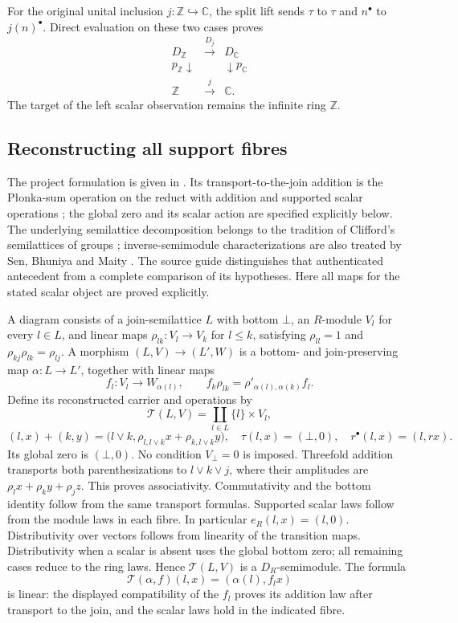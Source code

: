 For the original unital inclusion \(j:\mathbb Z\hookrightarrow\mathbb C\),
the split lift sends \(\tau\) to \(\tau\) and \(n^\bullet\) to
\(j(n)^\bullet\). Direct evaluation on these two cases proves
\[
\begin{array}{ccc}
D_{\mathbb Z}&\xrightarrow{D_j}&D_{\mathbb C}\\
p_{\mathbb Z}\downarrow&&\downarrow p_{\mathbb C}\\
\mathbb Z&\xrightarrow{j}&\mathbb C.
\end{array}
\]
The target of the left scalar observation remains the infinite ring
\(\mathbb Z\).

\subsection{Reconstructing all support fibres}
\label{app:support-equivalence}

The project formulation is given in
\cite[Definition~3.5 and Theorems~3.6--3.7]{SplitZeroSecondary2026}.
Its transport-to-the-join addition is the Płonka-sum operation on the
reduct with addition and supported scalar operations
\citep{TauPlonka1967,TauBonzio2018}; the global zero and its scalar action
are specified explicitly below.
The underlying semilattice decomposition belongs to the tradition of
Clifford's semilattices of groups \cite{TauClifford1941}; inverse-semimodule
characterizations are also treated by Sen, Bhuniya and Maity
\cite{TauSenBhuniyaMaity2021}. The source guide distinguishes that
authenticated antecedent from a complete comparison of its hypotheses.
Here all maps for the stated scalar object are proved explicitly.

A diagram consists of a join-semilattice \(L\) with bottom \(\bot\),
an \(R\)-module \(V_l\) for every \(l\in L\), and linear maps
\(\rho_{lk}:V_l\to V_k\) for \(l\le k\), satisfying
\(\rho_{ll}=1\) and \(\rho_{kj}\rho_{lk}=\rho_{lj}\).
A morphism \((L,V)\to(L',W)\) is a bottom- and join-preserving map
\(\alpha:L\to L'\), together with linear maps
\[
f_l:V_l\longrightarrow W_{\alpha(l)},\qquad
f_k\rho_{lk}=\rho'_{\alpha(l),\alpha(k)}f_l.
\]
Define its reconstructed carrier and operations by
\[
\mathcal T(L,V)=\coprod_{l\in L}\{l\}\times V_l,
\]
\[
(l,x)+(k,y)=
\bigl(l\vee k,\rho_{l,l\vee k}x+\rho_{k,l\vee k}y\bigr),
\quad
\tau(l,x)=(\bot,0),\quad
r^\bullet(l,x)=(l,rx).
\]
Its global zero is \((\bot,0)\). No condition \(V_\bot=0\) is imposed.
Threefold addition transports both parenthesizations to
\(l\vee k\vee j\), where their amplitudes are
\(\rho_lx+\rho_ky+\rho_jz\). This proves associativity.
Commutativity and the bottom identity follow from the same transport
formulas. Supported scalar laws follow from the module laws in each
fibre. In particular \(e_R(l,x)=(l,0)\). Distributivity over vectors
follows from linearity of the transition maps. Distributivity when a
scalar is absent uses the global bottom zero; all remaining cases
reduce to the ring laws. Hence \(\mathcal T(L,V)\) is a
\(D_R\)-semimodule. The formula
\[
\mathcal T(\alpha,f)(l,x)=(\alpha(l),f_lx)
\]
is linear: the displayed compatibility of the \(f_l\) proves its
addition law after transport to the join, and the scalar laws hold in
the indicated fibre.

